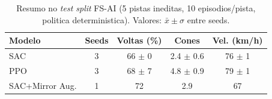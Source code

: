 \begin{table}[H]
\centering
\caption{Resumo no \textit{test split} FS-AI (5 pistas ineditas, 10 episodios/pista, politica deterministica). Valores: $\bar{x}\pm\sigma$ entre seeds.}
\label{tab:summary_main}
\begin{tabular}{lcccc}
\toprule
\textbf{Modelo} & \textbf{Seeds} & \textbf{Voltas (\%)} & \textbf{Cones} & \textbf{Vel. (km/h)} \\
\midrule
SAC & 3 & 66 $\pm$ 0 & 2.4 $\pm$ 0.6 & 76 $\pm$ 1 \\
PPO & 3 & 68 $\pm$ 7 & 4.8 $\pm$ 0.9 & 79 $\pm$ 1 \\
SAC+Mirror Aug. & 1 & 72 & 2.9 & 67 \\
\bottomrule
\end{tabular}
\end{table}
